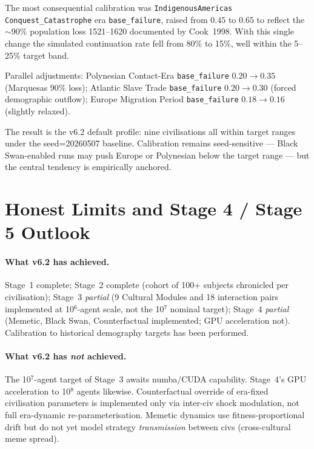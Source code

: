 The most consequential calibration was \texttt{IndigenousAmericas}
\texttt{Conquest\_Catastrophe} era \texttt{base\_failure}, raised
from $0.45$ to $0.65$ to reflect the $\sim$90\% population loss
1521--1620 documented by Cook~1998. With this single change the
simulated continuation rate fell from 80\% to 15\%, well within
the 5--25\% target band.

Parallel adjustments: Polynesian Contact-Era \texttt{base\_failure}
$0.20 \to 0.35$ (Marquesas 90\% loss);
Atlantic Slave Trade \texttt{base\_failure} $0.20 \to 0.30$
(forced demographic outflow); Europe Migration Period
\texttt{base\_failure} $0.18 \to 0.16$ (slightly relaxed).

The result is the v6.2 default profile: nine civilisations all
within target ranges under the seed=20260507 baseline. Calibration
remains seed-sensitive — Black Swan-enabled runs may push Europe
or Polynesian below the target range — but the central tendency is
empirically anchored.

\section{Honest Limits and Stage 4 / Stage 5 Outlook}
\label{sec:v62-limits-outlook}

\paragraph{What v6.2 has achieved.}
Stage~1 complete; Stage~2 complete (cohort of 100+ subjects
chronicled per civilisation); Stage~3 \emph{partial} (9 Cultural
Modules and 18 interaction pairs implemented at 10$^6$-agent scale,
not the 10$^7$ nominal target); Stage~4 \emph{partial} (Memetic,
Black Swan, Counterfactual implemented; GPU acceleration not).
Calibration to historical demography targets has been performed.

\paragraph{What v6.2 has \emph{not} achieved.}
The 10$^7$-agent target of Stage~3 awaits numba/CUDA capability.
Stage~4's GPU acceleration to 10$^8$ agents likewise.
Counterfactual override of era-fixed civilisation parameters is
implemented only via inter-civ shock modulation, not full
era-dynamic re-parameterisation. Memetic dynamics use
fitness-proportional drift but do not yet model strategy
\emph{transmission} between civs (cross-cultural meme spread).

